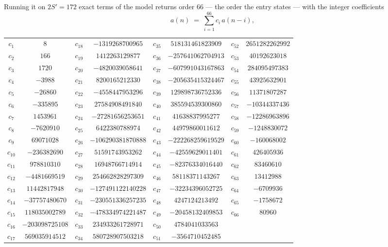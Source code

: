 \documentclass[11pt,a4paper]{article}
\theoremstyle{plain}
\theoremstyle{definition}
\begin{document}
Running it on $2S'=172$ exact terms of the model returns order $66$ --- the order the
entry states --- with the integer coefficients
\[
a(n)\;=\;\sum_{i=1}^{66}c_i\,a(n-i),
\]
\begin{center}\small
\begin{tabular}{cccccccc}
$c_{1}$ & $8$ & $c_{18}$ & $-1319268700965$ & $c_{35}$ & $518131461823909$ & $c_{52}$ & $2651282262992$ \\
$c_{2}$ & $166$ & $c_{19}$ & $1412263129877$ & $c_{36}$ & $-257641062704913$ & $c_{53}$ & $40192623018$ \\
$c_{3}$ & $1720$ & $c_{20}$ & $-4820039058641$ & $c_{37}$ & $-607991043167863$ & $c_{54}$ & $284095497383$ \\
$c_{4}$ & $-3988$ & $c_{21}$ & $8200165212330$ & $c_{38}$ & $-205635415324467$ & $c_{55}$ & $43925632901$ \\
$c_{5}$ & $-26860$ & $c_{22}$ & $-4558447953296$ & $c_{39}$ & $129898736752336$ & $c_{56}$ & $11371807287$ \\
$c_{6}$ & $-335895$ & $c_{23}$ & $27584908491840$ & $c_{40}$ & $385594539300860$ & $c_{57}$ & $-10344337436$ \\
$c_{7}$ & $1453961$ & $c_{24}$ & $-27281656253651$ & $c_{41}$ & $41638837995277$ & $c_{58}$ & $-12286963896$ \\
$c_{8}$ & $-7620910$ & $c_{25}$ & $6422380788974$ & $c_{42}$ & $44979860011612$ & $c_{59}$ & $-1248830072$ \\
$c_{9}$ & $69071028$ & $c_{26}$ & $-106290381870888$ & $c_{43}$ & $-222268259619529$ & $c_{60}$ & $-160068002$ \\
$c_{10}$ & $-236382690$ & $c_{27}$ & $51591743953262$ & $c_{44}$ & $-42559629011401$ & $c_{61}$ & $426405936$ \\
$c_{11}$ & $978810310$ & $c_{28}$ & $16948766714914$ & $c_{45}$ & $-82376334016440$ & $c_{62}$ & $83460610$ \\
$c_{12}$ & $-4481669519$ & $c_{29}$ & $254662828297309$ & $c_{46}$ & $58118371143267$ & $c_{63}$ & $13412988$ \\
$c_{13}$ & $11442817948$ & $c_{30}$ & $-127491122140228$ & $c_{47}$ & $-32234396052725$ & $c_{64}$ & $-6709936$ \\
$c_{14}$ & $-37757480670$ & $c_{31}$ & $-230551336257235$ & $c_{48}$ & $4247124213492$ & $c_{65}$ & $-1758672$ \\
$c_{15}$ & $118035002789$ & $c_{32}$ & $-478334974221487$ & $c_{49}$ & $-20458132409853$ & $c_{66}$ & $80960$ \\
$c_{16}$ & $-203098725108$ & $c_{33}$ & $234933261728971$ & $c_{50}$ & $4784041033563$ &  &  \\
$c_{17}$ & $569035914512$ & $c_{34}$ & $580728907503218$ & $c_{51}$ & $-3564710452485$ &  &  \\
\end{tabular}
\end{center}
\end{document}
